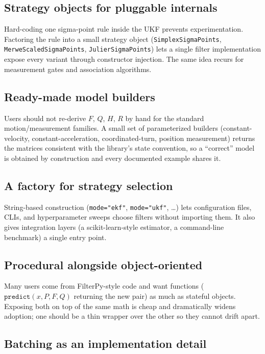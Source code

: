 \documentclass[10pt,conference]{IEEEtran}
\begin{document}
\subsection{Strategy objects for pluggable internals}

Hard-coding one sigma-point rule inside the UKF prevents experimentation.
Factoring the rule into a small strategy object
(\texttt{SimplexSigmaPoints}, \texttt{MerweScaledSigmaPoints},
\texttt{JulierSigmaPoints}) lets a single filter implementation expose every
variant through constructor injection. The same idea recurs for measurement
gates and association algorithms.

\subsection{Ready-made model builders}

Users should not re-derive $F$, $Q$, $H$, $R$ by hand for the standard
motion/measurement families. A small set of parameterized builders
(constant-velocity, constant-acceleration, coordinated-turn, position
measurement) returns the matrices consistent with the library's state
convention, so a ``correct'' model is obtained by construction and every
documented example shares it.

\subsection{A factory for strategy selection}

String-based construction (\texttt{mode="ekf"}, \texttt{mode="ukf"}, \dots)
lets configuration files, CLIs, and hyperparameter sweeps choose filters
without importing them. It also gives integration layers (a
scikit-learn-style estimator, a command-line benchmark) a single entry point.

\subsection{Procedural alongside object-oriented}

Many users come from FilterPy-style code and want functions
($\texttt{predict}(x,P,F,Q)$ returning the new pair) as much as stateful
objects. Exposing both on top of the same math is cheap and dramatically
widens adoption; one should be a thin wrapper over the other so they cannot
drift apart.

\subsection{Batching as an implementation detail}
\end{document}
